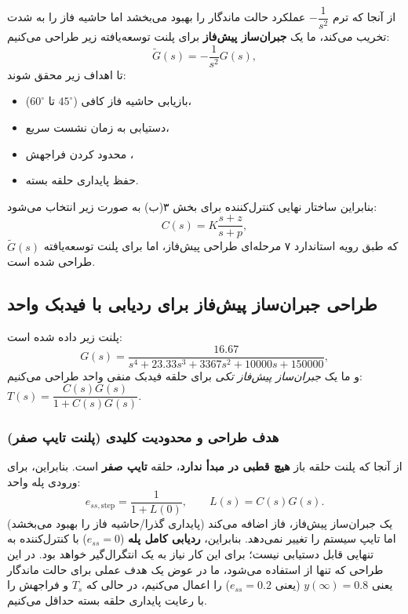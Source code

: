 \documentclass[a4paper]{article}
\begin{document}
از آنجا که ترم $-\dfrac{1}{s^2}$ عملکرد حالت ماندگار را بهبود می‌بخشد اما حاشیه فاز را به شدت تخریب می‌کند، ما یک \textbf{جبران‌ساز پیش‌فاز} برای پلنت توسعه‌یافته زیر طراحی می‌کنیم:
\[
\tilde{G}(s)= -\frac{1}{s^2}G(s),
\]
تا اهداف زیر محقق شوند:
\begin{itemize}
	\item بازیابی حاشیه فاز کافی ($45^\circ$ تا $60^\circ$)،
	\item دستیابی به زمان نشست سریع،
	\item محدود کردن فراجهش ،
	\item حفظ پایداری حلقه بسته.
\end{itemize}

بنابراین ساختار نهایی کنترل‌کننده برای بخش ۳(ب) به صورت زیر انتخاب می‌شود:
\[
C(s)=K\frac{s+z}{s+p},
\]
که طبق رویه استاندارد ۷ مرحله‌ای طراحی پیش‌فاز، اما برای پلنت توسعه‌یافته $\tilde{G}(s)$ طراحی شده است.

\subsection{طراحی جبران‌ساز پیش‌فاز  برای ردیابی با فیدبک واحد}

پلنت زیر داده شده است:
\begin{equation}
	G(s)=\frac{16.67}{s^4+23.33s^3+3367s^2+10000s+150000},
\end{equation}
و ما یک \emph{جبران‌ساز پیش‌فاز تکی} برای حلقه فیدبک منفی واحد طراحی می‌کنیم:
\(
T(s)=\dfrac{C(s)G(s)}{1+C(s)G(s)}.
\)

\subsubsection{هدف طراحی و محدودیت کلیدی (پلنت تایپ صفر)}
از آنجا که پلنت حلقه باز \textbf{هیچ قطبی در مبدأ ندارد}، حلقه \textbf{تایپ صفر}  است. بنابراین، برای ورودی پله واحد:
\begin{equation}
	e_{ss,\text{step}}=\frac{1}{1+L(0)},\qquad L(s)=C(s)G(s).
\end{equation}
یک جبران‌ساز پیش‌فاز، فاز اضافه می‌کند (پایداری گذرا/حاشیه فاز را بهبود می‌بخشد) اما تایپ سیستم را تغییر نمی‌دهد. بنابراین، \textbf{ردیابی کامل پله} ($e_{ss}=0$) با کنترل‌کننده  به تنهایی قابل دستیابی نیست؛ برای این کار نیاز به یک انتگرال‌گیر  خواهد بود. در این طراحی که تنها از  استفاده می‌شود، ما در عوض یک هدف عملی برای حالت ماندگار یعنی $y(\infty)=0.8$ (یعنی $e_{ss}=0.2$) را اعمال می‌کنیم، در حالی که $T_s$ و فراجهش را با رعایت پایداری حلقه بسته حداقل می‌کنیم.
\end{document}
